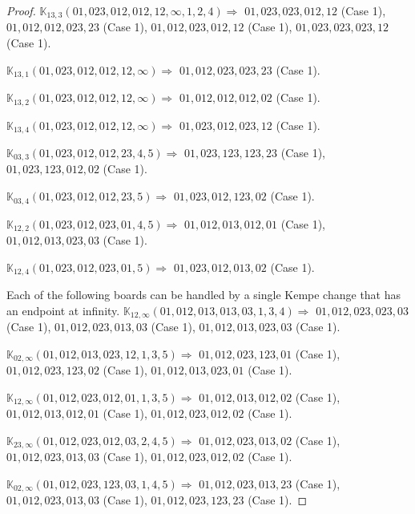 \documentclass[12pt]{article}
\newcommand{\K}{\mathbb{K}}
\begin{document}
\begin{proof}
\bigskip

$\K_{13,3}(01,023,012,012,12,\infty,1, 2, 4)\Rightarrow $ $01,023,023,012,12$ (Case 1), $01,012,012,023,23$ (Case 1), $01,012,023,012,12$ (Case 1), $01,023,023,023,12$ (Case 1).

$\K_{13,1}(01,023,012,012,12,\infty)\Rightarrow $ $01,012,023,023,23$ (Case 1).

$\K_{13,2}(01,023,012,012,12,\infty)\Rightarrow $ $01,012,012,012,02$ (Case 1).

$\K_{13,4}(01,023,012,012,12,\infty)\Rightarrow $ $01,023,012,023,12$ (Case 1).


\bigskip

$\K_{03,3}(01,023,012,012,23,4, 5)\Rightarrow $ $01,023,123,123,23$ (Case 1), $01,023,123,012,02$ (Case 1).

$\K_{03,4}(01,023,012,012,23,5)\Rightarrow $ $01,023,012,123,02$ (Case 1).


\bigskip

$\K_{12,2}(01,023,012,023,01,4, 5)\Rightarrow $ $01,012,013,012,01$ (Case 1), $01,012,013,023,03$ (Case 1).

$\K_{12,4}(01,023,012,023,01,5)\Rightarrow $ $01,023,012,013,02$ (Case 1).


\bigskip

Each of the following boards can be handled by a single Kempe change that has an endpoint at infinity.
$\K_{12,\infty}(01,012,013,013,03,1, 3, 4)\Rightarrow $ $01,012,023,023,03$ (Case 1), $01,012,023,013,03$ (Case 1), $01,012,013,023,03$ (Case 1).

\bigskip

$\K_{02,\infty}(01,012,013,023,12,1, 3, 5)\Rightarrow $ $01,012,023,123,01$ (Case 1), $01,012,023,123,02$ (Case 1), $01,012,013,023,01$ (Case 1).

\bigskip

$\K_{12,\infty}(01,012,023,012,01,1, 3, 5)\Rightarrow $ $01,012,013,012,02$ (Case 1), $01,012,013,012,01$ (Case 1), $01,012,023,012,02$ (Case 1).

\bigskip

$\K_{23,\infty}(01,012,023,012,03,2, 4, 5)\Rightarrow $ $01,012,023,013,02$ (Case 1), $01,012,023,013,03$ (Case 1), $01,012,023,012,02$ (Case 1).

\bigskip

$\K_{02,\infty}(01,012,023,123,03,1, 4, 5)\Rightarrow $ $01,012,023,013,23$ (Case 1), $01,012,023,013,03$ (Case 1), $01,012,023,123,23$ (Case 1).

\bigskip


\end{proof}
\end{document}
